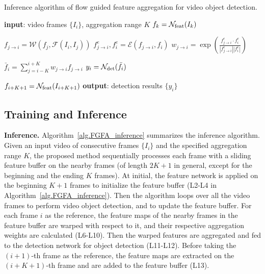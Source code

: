\documentclass[10pt,twocolumn,letterpaper]{article}
\begin{document}
\begin{algorithm}[t]
\caption{Inference algorithm of flow guided feature aggregation for video object detection.}
\small
\begin{algorithmic}[1] \State \textbf{input}: video frames $\{I_i\}$, aggregation range $K$
                            
\State $f_k = \mathcal{N}_{\rm feat}(I_k)$
\EndFor

		

		
\State $f_{j \rightarrow i} = \mathcal{W}(f_j, \mathcal{F}(I_i, I_j))$			
\State $f^e_{j \rightarrow i},f^e_i = \mathcal{E}(f_{j \rightarrow i},f_i)$	
\State $w_{j \rightarrow i}= \exp(\frac{f^e_{j \rightarrow i}\cdot f^e_i}{|f^e_{j \rightarrow i}| |f^e_i|})$	
\EndFor

\State $\bar f_i = \sum_{j=i-K}^{i+K} w_{j \rightarrow i} f_{j \rightarrow i}$ 	
\State $y_i = \mathcal{N}_{\rm det}(\bar f_i)$		

\State $f_{i+K+1} = \mathcal{N}_{\rm feat}(I_{i+K+1})$		
\EndFor
\State \textbf{output}: detection results $\{y_{i}\}$
\end{algorithmic}
\label{alg.FGFA_inference}
\end{algorithm}


\subsection{Training and Inference}

\textbf{Inference.} Algorithm~\ref{alg.FGFA_inference} summarizes the inference algorithm. Given an input video of consecutive frames $\{I_i\}$ and the specified aggregation range $K$, the proposed method sequentially processes each frame with a sliding feature buffer on the nearby frames (of length $2K+1$ in general, except for the beginning and the ending $K$ frames). At initial, the feature network is applied on the beginning $K+1$ frames to initialize the feature buffer (L2-L4 in Algorithm~\ref{alg.FGFA_inference}). Then the algorithm loops over all the video frames to perform video object detection, and to update the feature buffer. For each frame $i$ as the reference, the feature maps of the nearby frames in the feature buffer are warped with respect to it, and their respective aggregation weights are calculated (L6-L10). Then the warped features are aggregated and fed to the detection network for object detection (L11-L12). Before taking the $(i+1)$-th frame as the reference, the feature maps are extracted on the $(i+K+1)$-th frame and are added to the feature buffer (L13).
\end{document}
